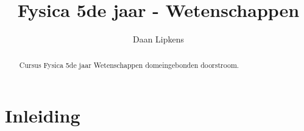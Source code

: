 \documentclass{xourse}
\title{Fysica 5de jaar - Wetenschappen}
\author{Daan Lipkens}
\begin{document}
\begin{abstract}
    Cursus Fysica 5de jaar Wetenschappen domeingebonden doorstroom.
\end{abstract}
\maketitle


\part{Inleiding}
\end{document}
